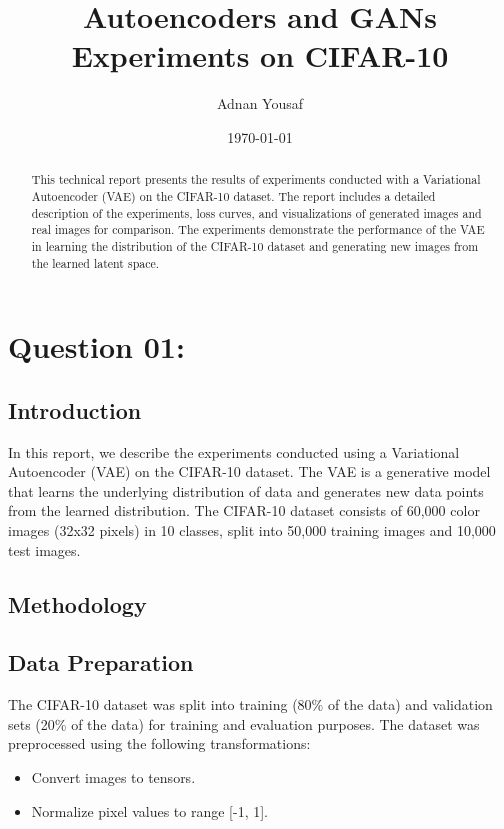 \documentclass{article}
\begin{document}
\title{Autoencoders and GANs Experiments on CIFAR-10}
\author{Adnan Yousaf}
\date{\today}

\maketitle
\section{Question 01:}
\begin{abstract}
This technical report presents the results of experiments conducted with a Variational Autoencoder (VAE) on the CIFAR-10 dataset. The report includes a detailed description of the experiments, loss curves, and visualizations of generated images and real images for comparison. The experiments demonstrate the performance of the VAE in learning the distribution of the CIFAR-10 dataset and generating new images from the learned latent space.
\end{abstract}

\subsection{Introduction}
In this report, we describe the experiments conducted using a Variational Autoencoder (VAE) on the CIFAR-10 dataset. The VAE is a generative model that learns the underlying distribution of data and generates new data points from the learned distribution. The CIFAR-10 dataset consists of 60,000 color images (32x32 pixels) in 10 classes, split into 50,000 training images and 10,000 test images.

\subsection{Methodology}
\subsection{Data Preparation}
The CIFAR-10 dataset was split into training (80\% of the data) and validation sets (20\% of the data) for training and evaluation purposes. The dataset was preprocessed using the following transformations:
\begin{itemize}
    \item Convert images to tensors.
    \item Normalize pixel values to range [-1, 1].
\end{itemize}
\end{document}
